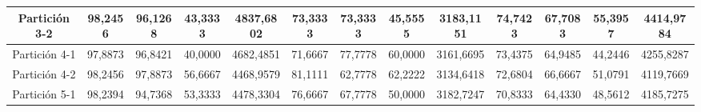 \documentclass[12pt]{article}
\begin{document}
\begin{table}[H]
{\begin{tabular}{|c|cccc|cccc|cccc|}
Partición 3-2 & \multicolumn{1}{c|}{98,2456}                                                  & \multicolumn{1}{c|}{96,1268}                                                 & \multicolumn{1}{c|}{43,3333} & 4837,6802 & \multicolumn{1}{c|}{73,3333}                                                  & \multicolumn{1}{c|}{73,3333}                                                 & \multicolumn{1}{c|}{45,5555} & 3183,1151 & \multicolumn{1}{c|}{74,7423}                                                  & \multicolumn{1}{c|}{67,7083}                                                 & \multicolumn{1}{c|}{55,3957} & 4414,9784 \\ \hline
Partición 4-1 & \multicolumn{1}{c|}{97,8873}                                                  & \multicolumn{1}{c|}{96,8421}                                                 & \multicolumn{1}{c|}{40,0000} & 4682,4851 & \multicolumn{1}{c|}{71,6667}                                                  & \multicolumn{1}{c|}{77,7778}                                                 & \multicolumn{1}{c|}{60,0000} & 3161,6695 & \multicolumn{1}{c|}{73,4375}                                                  & \multicolumn{1}{c|}{64,9485}                                                 & \multicolumn{1}{c|}{44,2446} & 4255,8287 \\ \hline
Partición 4-2 & \multicolumn{1}{c|}{98,2456}                                                  & \multicolumn{1}{c|}{97,8873}                                                 & \multicolumn{1}{c|}{56,6667} & 4468,9579 & \multicolumn{1}{c|}{81,1111}                                                  & \multicolumn{1}{c|}{62,7778}                                                 & \multicolumn{1}{c|}{62,2222} & 3134,6418 & \multicolumn{1}{c|}{72,6804}                                                  & \multicolumn{1}{c|}{66,6667}                                                 & \multicolumn{1}{c|}{51,0791} & 4119,7669 \\ \hline
Partición 5-1 & \multicolumn{1}{c|}{98,2394}                                                  & \multicolumn{1}{c|}{94,7368}                                                 & \multicolumn{1}{c|}{53,3333} & 4478,3304 & \multicolumn{1}{c|}{76,6667}                                                  & \multicolumn{1}{c|}{67,7778}                                                 & \multicolumn{1}{c|}{50,0000} & 3182,7247 & \multicolumn{1}{c|}{70,8333}                                                  & \multicolumn{1}{c|}{64,4330}                                                 & \multicolumn{1}{c|}{48,5612} & 4185,7275 \\ \hline

\end{tabular}}
\end{table}
\end{document}
